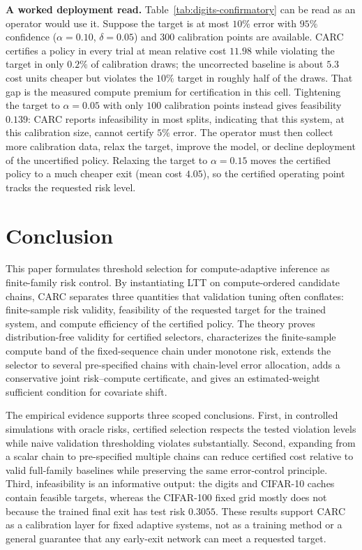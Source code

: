 \documentclass{ieeeaccess}
\begin{document}
\textbf{A worked deployment read.} Table~\ref{tab:digits-confirmatory} can be read as an operator would use it. Suppose the target is at most $10\%$ error with $95\%$ confidence ($\alpha=0.10$, $\delta=0.05$) and $300$ calibration points are available. CARC certifies a policy in every trial at mean relative cost $11.98$ while violating the target in only $0.2\%$ of calibration draws; the uncorrected baseline is about $5.3$ cost units cheaper but violates the $10\%$ target in roughly half of the draws. That gap is the measured compute premium for certification in this cell. Tightening the target to $\alpha=0.05$ with only $100$ calibration points instead gives feasibility $0.139$: CARC reports infeasibility in most splits, indicating that this system, at this calibration size, cannot certify $5\%$ error. The operator must then collect more calibration data, relax the target, improve the model, or decline deployment of the uncertified policy. Relaxing the target to $\alpha=0.15$ moves the certified policy to a much cheaper exit (mean cost $4.05$), so the certified operating point tracks the requested risk level.

\section{Conclusion}

This paper formulates threshold selection for compute-adaptive inference as finite-family risk control. By instantiating LTT on compute-ordered candidate chains, CARC separates three quantities that validation tuning often conflates: finite-sample risk validity, feasibility of the requested target for the trained system, and compute efficiency of the certified policy. The theory proves distribution-free validity for certified selectors, characterizes the finite-sample compute band of the fixed-sequence chain under monotone risk, extends the selector to several pre-specified chains with chain-level error allocation, adds a conservative joint risk--compute certificate, and gives an estimated-weight sufficient condition for covariate shift.

The empirical evidence supports three scoped conclusions. First, in controlled simulations with oracle risks, certified selection respects the tested violation levels while naive validation thresholding violates substantially. Second, expanding from a scalar chain to pre-specified multiple chains can reduce certified cost relative to valid full-family baselines while preserving the same error-control principle. Third, infeasibility is an informative output: the digits and CIFAR-10 caches contain feasible targets, whereas the CIFAR-100 fixed grid mostly does not because the trained final exit has test risk $0.3055$. These results support CARC as a calibration layer for fixed adaptive systems, not as a training method or a general guarantee that any early-exit network can meet a requested target.
\end{document}
